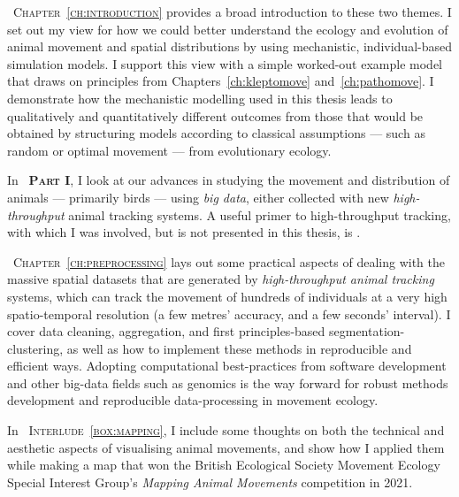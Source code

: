 {\scshape~Chapter~\ref{ch:introduction}} provides a broad introduction to these two themes.
I set out my view for how we could better understand the ecology and evolution of animal movement and spatial distributions by using mechanistic, individual-based simulation models.
I support this view with a simple worked-out example model that draws on principles from Chapters~\ref{ch:kleptomove} and~\ref{ch:pathomove}.
I demonstrate how the mechanistic modelling used in this thesis leads to qualitatively and quantitatively different outcomes from those that would be obtained by structuring models according to classical assumptions --- such as random or optimal movement --- from evolutionary ecology.

\medskip

\noindent In {\scshape~\textbf{Part I}}, I look at our advances in studying the movement and distribution of animals --- primarily birds --- using \textit{big data}, either collected with new \textit{high-throughput} animal tracking systems.
A useful primer to high-throughput tracking, with which I was involved, but is not presented in this thesis, is \textcite{nathan2022}.

\medskip

{\scshape~Chapter~\ref{ch:preprocessing}} lays out some practical aspects of dealing with the massive spatial datasets that are generated by \textit{high-throughput animal tracking} systems, which can track the movement of hundreds of individuals at a very high spatio-temporal resolution (a few metres' accuracy, and a few seconds' interval).
I cover data cleaning, aggregation, and first principles-based segmentation-clustering, as well as how to implement these methods in reproducible and efficient ways.
Adopting computational best-practices from software development and other big-data fields such as genomics is the way forward for robust methods development and reproducible data-processing in movement ecology.

\medskip

\noindent In {\scshape~Interlude~\ref{box:mapping}}, I include some thoughts on both the technical and aesthetic aspects of visualising animal movements, and show how I applied them while making a map that won the British Ecological Society Movement Ecology Special Interest Group's \emph{Mapping Animal Movements} competition in 2021.

\medskip

